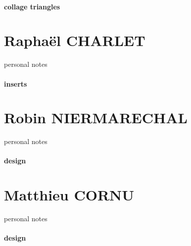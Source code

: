 \paragraph{collage triangles} 
\newpage \section*{Raphaël CHARLET} 
 \par personal notes
\paragraph{inserts} 
\newpage \section*{Robin NIERMARECHAL} 
 \par personal notes
\paragraph{design} 
\newpage \section*{Matthieu CORNU} 
 \par personal notes
\paragraph{design} 
